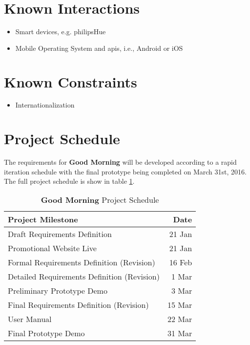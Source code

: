 \documentclass[11pt]{article}
\begin{document}
%
\section{Known Interactions}\label{known-interactions}

\begin{itemize}
\item
  Smart devices, e.g. \gls{philipsHue}
\item
  Mobile Operating System and \glspl{api}, i.e., Android or iOS
\end{itemize}


%
\section{Known Constraints}\label{known-constraints}

\begin{itemize}
 \item Internationalization
\end{itemize}


%
\section{Project Schedule}\label{project-schedule}

The requirements for \textbf{Good Morning} will be developed according to a rapid iteration schedule with the final prototype being completed on March 31st, 2016. The full project schedule is show in table \ref{tab:schedule}.

\begin{table}[htb]
    \caption{\textbf{Good Morning} Project Schedule}\label{tab:schedule}
    \centering
    \begin{tabular}{|lr|}
        \hline
        \textbf{Project Milestone} & \textbf{Date} \\
        \hline
        Draft Requirements Definition & 21 Jan \\
        Promotional Website Live & 21 Jan \\
        Formal Requirements Definition (Revision) & 16 Feb \\
        Detailed Requirements Definition (Revision) & 1 Mar \\
        Preliminary Prototype Demo & 3 Mar \\
        Final Requirements Definition (Revision) & 15 Mar \\
        User Manual & 22 Mar \\
        Final Prototype Demo & 31 Mar \\
        \hline
    \end{tabular}
\end{table}
\end{document}
